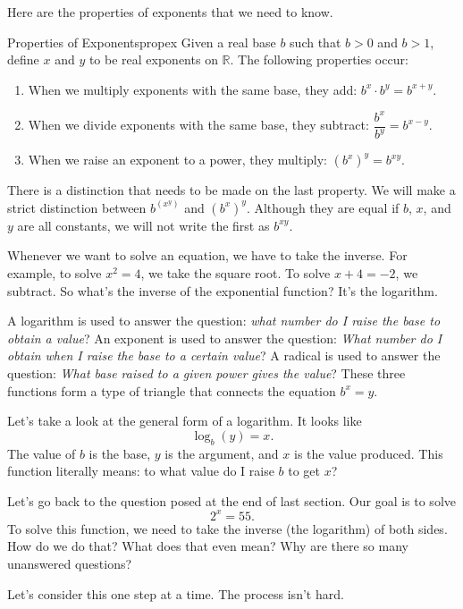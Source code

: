 \documentclass[lang=en,11pt]{elegantbook}
\begin{document}
Here are the properties of exponents that we need to know.
\begin{theorem}{Properties of Exponents}{propex}
Given a real base $b$ such that $b>0$ and $b>1$, define $x$ and $y$ to be real exponents on $\mathbb{R}$.  The following properties occur: \begin{enumerate}
    \item When we multiply exponents with the same base, they add: $b^x \cdot b^y=b^{x+y}$.
    \item When we divide exponents with the same base, they subtract: $\dfrac{b^x}{b^y}=b^{x-y}$.
    \item When we raise an exponent to a power, they multiply: $\left(b^x\right)^y=b^{xy}$.
\end{enumerate}
\end{theorem}
\begin{note}
There is a distinction that needs to be made on the last property.  We will make a strict distinction between $b^{\left(x^y\right)}$ and $\left(b^x\right)^y$.  Although they are equal if $b$, $x$, and $y$ are all constants, we will not write the first as $b^{xy}$.
\end{note}

Whenever we want to solve an equation, we have to take the inverse.  For example, to solve $x^2=4$, we take the square root.  To solve $x+4=-2$, we subtract.  So what's the inverse of the exponential function? It's the logarithm.

A logarithm is used to answer the question: \textit{what number do I raise the base to obtain a value}?  An exponent is used to answer the question: \textit{What number do I obtain when I raise the base to a certain value}? A radical is used to answer the question: \textit{What base raised to a given power gives the value}?  These three functions form a type of triangle that connects the equation $b^x=y$.

Let's take a look at the general form of a logarithm.  It looks like $$\log_b(y)=x.$$  The value of $b$ is the base, $y$ is the argument, and $x$ is the value produced.  This function literally means: to what value do I raise $b$ to get $x$?

Let's go back to the question posed at the end of last section.  Our goal is to solve $$2^x=55.$$  To solve this function, we need to take the inverse (the logarithm) of both sides.  How do we do that?  What does that even mean?  Why are there so many unanswered questions?

Let's consider this one step at a time.  The process isn't hard.
\end{document}
